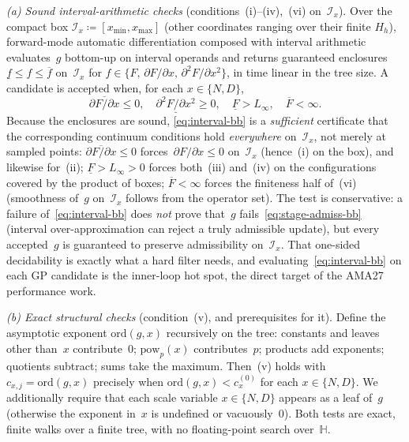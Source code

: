 \documentclass[11pt]{article}
\newcommand{\calI}{\mathcal{I}}
\newcommand{\bbH}{\mathbb{H}}
\begin{document}
\smallskip\noindent
\emph{(a) Sound interval-arithmetic checks} (conditions~(i)--(iv),~(vi) on~$\calI_x$).
Over the compact box $\calI_x \coloneqq [x_{\min}, x_{\max}]$ (other coordinates ranging over their finite $H_h$), forward-mode automatic differentiation composed with interval arithmetic~\citep{moore2009interval,kronberger2022shape} evaluates~$g$ bottom-up on interval operands and returns guaranteed enclosures
$\underline{f} \leq f \leq \overline{f}$ on~$\calI_x$ for $f \in \{F,\, \partial F/\partial x,\, \partial^2 F/\partial x^2\}$, in time linear in the tree size.
A candidate is accepted when, for each $x \in \{N,D\}$,
\begin{equation}\label{eq:interval-bb}
    \overline{\partial F / \partial x} \leq 0,
    \quad
    \underline{\partial^2 F / \partial x^2} \geq 0,
    \quad
    \underline{F} > L_\infty ,
    \quad
    \overline{F} < \infty .
\end{equation}
Because the enclosures are sound, \eqref{eq:interval-bb} is a \emph{sufficient} certificate that the corresponding continuum conditions hold \emph{everywhere} on~$\calI_x$, not merely at sampled points:
$\overline{\partial F/\partial x} \leq 0$ forces~$\partial F/\partial x \leq 0$ on~$\calI_x$ (hence~(i) on the box), and likewise for~(ii);
$\underline{F} > L_\infty > 0$ forces both~(iii) and~(iv) on the configurations covered by the product of boxes;
$\overline{F} < \infty$ forces the finiteness half of~(vi) (smoothness of~$g$ on~$\calI_x$ follows from the operator set).
The test is conservative: a failure of~\eqref{eq:interval-bb} does \emph{not} prove that~$g$ fails~\eqref{eq:stage-admiss-bb} (interval over-approximation can reject a truly admissible update), but every accepted~$g$ is guaranteed to preserve admissibility on~$\calI_x$.
That one-sided decidability is exactly what a hard filter needs, and evaluating~\eqref{eq:interval-bb} on each GP candidate is the inner-loop hot spot, the direct target of the AMA27 performance work.

\smallskip\noindent
\emph{(b) Exact structural checks} (condition~(v), and prerequisites for it).
Define the asymptotic exponent $\mathrm{ord}(g,x)$ recursively on the tree: constants and leaves other than~$x$ contribute~$0$; $\mathrm{pow}_p(x)$ contributes~$p$; products add exponents; quotients subtract; sums take the maximum.
Then~(v) holds with $c_{x,j} = \mathrm{ord}(g,x)$ precisely when $\mathrm{ord}(g,x) < c_x^{(0)}$ for each $x \in \{N,D\}$.
We additionally require that each scale variable $x \in \{N,D\}$ appears as a leaf of~$g$ (otherwise the exponent in~$x$ is undefined or vacuously~$0$).
Both tests are exact, finite walks over a finite tree, with no floating-point search over~$\bbH$.
\end{document}

